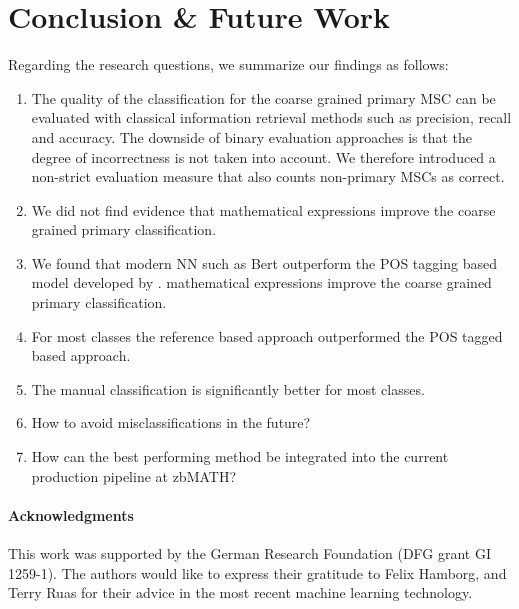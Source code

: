 \section{Conclusion \& Future Work}\label{sec.concl}
Regarding the research questions, we summarize our findings as follows:
\begin{enumerate}
  \item The quality of the classification for the coarse grained primary MSC can be evaluated with classical information retrieval methods such as precision, recall and accuracy. The downside of binary evaluation approaches is that the degree of incorrectness is not taken into account. We therefore introduced a non-strict evaluation measure that also counts non-primary MSCs as correct.
  \item We did not find evidence that mathematical expressions improve the coarse grained primary classification.
  \item We found that modern NN such as Bert outperform the POS tagging based model developed by \cite{SchonebergS14}. mathematical expressions improve the coarse grained primary classification.
  \item For most classes the reference based approach outperformed the POS tagged based approach.
  \item The manual classification is significantly better for most classes. 
  \item How to avoid misclassifications in the future?
  \item How can the best performing method be integrated into the current production pipeline at zbMATH?
\end{enumerate}

\paragraph{Acknowledgments} This work was supported by the German Research Foundation (DFG grant GI 1259-1).
The authors would like to express their gratitude to Felix Hamborg, and Terry Ruas for their advice in the most recent machine learning technology.
\printbibliography[keyword=primary]